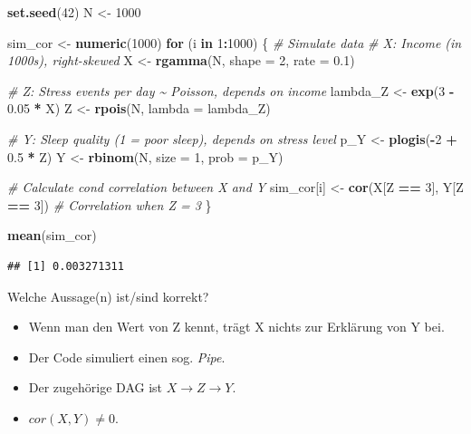 \documentclass[
]{book}
\newenvironment{Shaded}{\begin{snugshade}}{\end{snugshade}}
\newcommand{\AttributeTok}[1]{\textcolor[rgb]{0.13,0.29,0.53}{#1}}
\newcommand{\CommentTok}[1]{\textcolor[rgb]{0.56,0.35,0.01}{\textit{#1}}}
\newcommand{\ControlFlowTok}[1]{\textcolor[rgb]{0.13,0.29,0.53}{\textbf{#1}}}
\newcommand{\DecValTok}[1]{\textcolor[rgb]{0.00,0.00,0.81}{#1}}
\newcommand{\FloatTok}[1]{\textcolor[rgb]{0.00,0.00,0.81}{#1}}
\newcommand{\FunctionTok}[1]{\textcolor[rgb]{0.13,0.29,0.53}{\textbf{#1}}}
\newcommand{\NormalTok}[1]{#1}
\newcommand{\OtherTok}[1]{\textcolor[rgb]{0.56,0.35,0.01}{#1}}
\newcommand{\SpecialCharTok}[1]{\textcolor[rgb]{0.81,0.36,0.00}{\textbf{#1}}}
\providecommand{\tightlist}{%
  \setlength{\itemsep}{0pt}\setlength{\parskip}{0pt}}
\begin{document}
\begin{Shaded}
\begin{Highlighting}[]
\FunctionTok{set.seed}\NormalTok{(}\DecValTok{42}\NormalTok{)}
\NormalTok{N }\OtherTok{\textless{}{-}} \DecValTok{1000}

\NormalTok{sim\_cor }\OtherTok{\textless{}{-}} \FunctionTok{numeric}\NormalTok{(}\DecValTok{1000}\NormalTok{)}
\ControlFlowTok{for}\NormalTok{ (i }\ControlFlowTok{in} \DecValTok{1}\SpecialCharTok{:}\DecValTok{1000}\NormalTok{) \{}
  \CommentTok{\# Simulate data}
  \CommentTok{\# X: Income (in 1000s), right{-}skewed}
\NormalTok{  X }\OtherTok{\textless{}{-}} \FunctionTok{rgamma}\NormalTok{(N, }\AttributeTok{shape =} \DecValTok{2}\NormalTok{, }\AttributeTok{rate =} \FloatTok{0.1}\NormalTok{)}
  
  \CommentTok{\# Z: Stress events per day \textasciitilde{} Poisson, depends on income}
\NormalTok{  lambda\_Z }\OtherTok{\textless{}{-}} \FunctionTok{exp}\NormalTok{(}\DecValTok{3} \SpecialCharTok{{-}} \FloatTok{0.05} \SpecialCharTok{*}\NormalTok{ X)}
\NormalTok{  Z }\OtherTok{\textless{}{-}} \FunctionTok{rpois}\NormalTok{(N, }\AttributeTok{lambda =}\NormalTok{ lambda\_Z)}
  
  \CommentTok{\# Y: Sleep quality (1 = poor sleep), depends on stress level}
\NormalTok{  p\_Y }\OtherTok{\textless{}{-}} \FunctionTok{plogis}\NormalTok{(}\SpecialCharTok{{-}}\DecValTok{2} \SpecialCharTok{+} \FloatTok{0.5} \SpecialCharTok{*}\NormalTok{ Z)}
\NormalTok{  Y }\OtherTok{\textless{}{-}} \FunctionTok{rbinom}\NormalTok{(N, }\AttributeTok{size =} \DecValTok{1}\NormalTok{, }\AttributeTok{prob =}\NormalTok{ p\_Y)}
  
  \CommentTok{\# Calculate cond correlation between X and Y}
\NormalTok{  sim\_cor[i] }\OtherTok{\textless{}{-}} \FunctionTok{cor}\NormalTok{(X[Z }\SpecialCharTok{==} \DecValTok{3}\NormalTok{], Y[Z }\SpecialCharTok{==} \DecValTok{3}\NormalTok{])  }\CommentTok{\# Correlation when Z = 3}
\NormalTok{\}}

\FunctionTok{mean}\NormalTok{(sim\_cor)}
\end{Highlighting}
\end{Shaded}

\begin{verbatim}
## [1] 0.003271311
\end{verbatim}

Welche Aussage(n) ist/sind korrekt?

\begin{itemize}
\tightlist
\item
  Wenn man den Wert von Z kennt, trägt X nichts zur Erklärung von Y bei.
\item
  Der Code simuliert einen sog. \emph{Pipe}.
\item
  Der zugehörige DAG ist \(X \rightarrow Z \rightarrow Y\).
\item
  \(cor(X, Y) \ne 0\).
\end{itemize}


\end{document}
